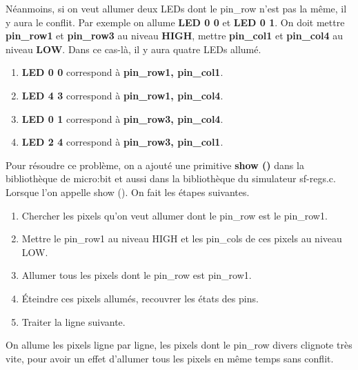 \documentclass[14px]{article}
\begin{document}
	Néanmoins, si on veut allumer deux LEDs dont le pin\_row n'est pas la même, il y aura le conflit. Par exemple on allume \textbf{LED 0 0} et \textbf{LED 0 1}. On doit mettre \textbf{pin\_row1} et \textbf{pin\_row3} au niveau \textbf{HIGH}, mettre \textbf{pin\_col1} et \textbf{pin\_col4} au niveau \textbf{LOW}. Dans ce cas-là, il y aura quatre LEDs allumé.
	\begin{enumerate}
		\item \textbf{LED 0 0} correspond à \textbf{pin\_row1, pin\_col1}.
		\item \textbf{LED 4 3} correspond à \textbf{pin\_row1, pin\_col4}.
		\item \textbf{LED 0 1} correspond à \textbf{pin\_row3, pin\_col4}.
		\item \textbf{LED 2 4} correspond à \textbf{pin\_row3, pin\_col1}.
	\end{enumerate}
	\begin{figure}[htbp]
	\end{figure}
	
	Pour résoudre ce problème, on a ajouté une primitive \textbf{show ()} dans la bibliothèque de micro:bit et aussi dans la bibliothèque du simulateur sf-regs.c. Lorsque l'on appelle show (). On fait les étapes suivantes.
	\begin{enumerate}
		\item Chercher les pixels qu'on veut allumer dont le pin\_row est le pin\_row1.
		\item Mettre le pin\_row1 au niveau HIGH et les pin\_cols de ces pixels au niveau LOW.
		\item Allumer tous les pixels dont le pin\_row est pin\_row1.
		\item Éteindre ces pixels allumés, recouvrer les états des pins.
		\item Traiter la ligne suivante.
	\end{enumerate}
	On allume les pixels ligne par ligne, les pixels dont le pin\_row divers clignote très vite, pour avoir un effet d'allumer tous les pixels en même temps sans conflit.
	
\end{document}
